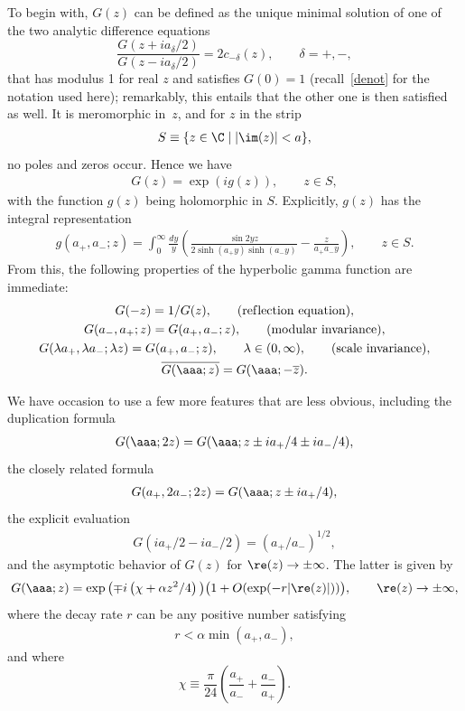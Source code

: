  To begin with, $G(z)$ can be def\/ined as the unique minimal solution of one of the two analytic dif\/ference equations
\begin{equation}\label{Gades}
	\frac{G(z+ia_\delta/2)}{G(z-ia_\delta/2)} = 2c_{-\delta}(z),\qquad  \delta=+,-,
\end{equation}
that has modulus 1 for real $z$ and satisf\/ies $G(0)=1$ (recall~\eqref{denot} for the notation used here); remarkably, this entails that the other one is then satisf\/ied as well.
It is meromorphic in~$z$,
and for $z$ in the strip
\begin{gather}\label{strip}
S\equiv \{z\in\C \mid |\im (z)|<a\},
\end{gather}
no poles and zeros occur. Hence we have
\begin{gather}\label{Gg}
G(z)=\exp(ig(z)),\qquad z\in S,
\end{gather}
with the function $g(z)$ being holomorphic in $S$.
 Explicitly, $g(z)$ has the integral representation
\begin{gather}\label{ghyp}
g(a_{+},a_{-};z) =\int_0^\infty\frac{dy}{y}\left(\frac{\sin 2yz}{2\sinh(a_{+}y)\sinh(a_{-}y)} - \frac{z}{a_{+}a_{-} y}\right),\qquad z\in S.
\end{gather}
From this, the following properties of the hyperbolic gamma function are immediate:
\begin{gather}\label{refl}	
G(-z) = 1/G(z),\qquad ({\rm ref\/lection\ equation}),
\\
\label{modinv}
G(a_-,a_+;z) = G(a_+,a_-;z),\qquad  ({\rm modular\ invariance}),
\\
\label{sc}
	G(\lambda a_+,\lambda a_-;\lambda z) = G(a_+,a_-;z),\qquad \lambda\in(0,\infty),\qquad ({\rm scale\ invariance}),
\\
\label{Gcon}
\overline{G(\aaa;z)}=G(\aaa;-\overline{z}).
\end{gather}

We have occasion to use a few more features that are less obvious, including the duplication formula
\begin{gather}\label{dupl}
G(\aaa;2z)=G(\aaa;z\pm ia_{+}/4 \pm ia_{-}/4),
\end{gather}
the closely related formula
\begin{gather}\label{G2}
G(a_{+},2a_{-};2z)=G(\aaa;z\pm ia_{+}/4),
\end{gather}
the explicit evaluation
\begin{gather}\label{Geval}
G(ia_{+}/2-ia_{-}/2)=(a_{+}/a_{-})^{1/2},
\end{gather}
and the asymptotic behavior of $G(z)$ for $\re (z)\to\pm \infty$. The latter is given by
\begin{gather}\label{Gas}
	G(\aaa;z) = \exp \big({\mp} i\left(\chi+\alpha z^2/4\right)\big)\big(1 + O(\exp(-r |\re(z)|))\big),\qquad \re(z)\to\pm\infty,
\end{gather}
where the decay rate $r$ can be any positive number satisfying
\begin{gather}
r <\alpha \min(a_+,a_-),
\end{gather}
and where
\begin{equation}\label{chi}
 \chi \equiv \frac{\pi}{24}\left(\frac{a_+}{a_-} + \frac{a_-}{a_+}\right).
\end{equation}

